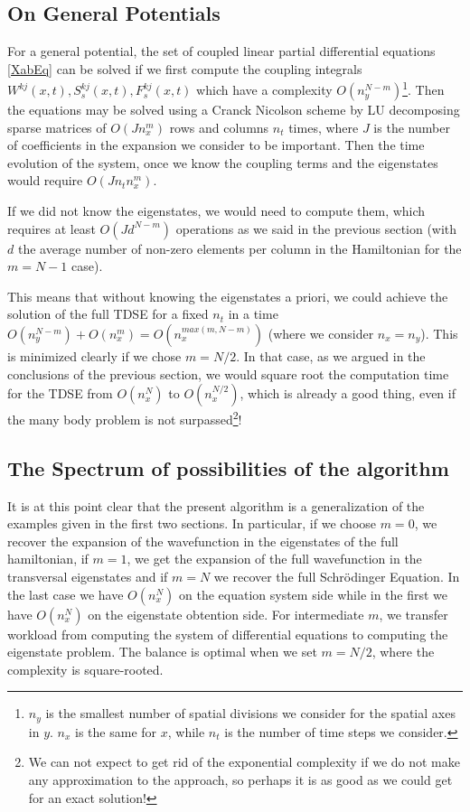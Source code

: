 \documentclass[11pt, a4paper]{article} %
\begin{document}
\subsection{On General Potentials}
For a general potential, the set of coupled linear partial differential equations \eqref{XabEq} can be solved if we first compute the coupling integrals $W^{kj}(x,t),S^{kj}_s(x,t),F^{kj}_s(x,t)$ which have a complexity $O(n_y^{N-m})$\footnote{$n_y$ is the smallest number of spatial divisions we consider for the spatial axes in $y$. $n_x$ is the same for $x$, while $n_t$ is the number of time steps we consider.}. Then the equations may be solved using a Cranck Nicolson scheme by LU decomposing sparse matrices of $O(Jn_x^m)$ rows and columns $n_t$ times, where $J$ is the number of coefficients in the expansion we consider to be important. Then the time evolution of the system, once we know the coupling terms and the eigenstates would require $O(Jn_tn_x^m)$.

If we did not know the eigenstates, we would need to compute them, which requires at least $O(Jd^{N-m})$ operations as we said in the previous section (with $d$ the average number of non-zero elements per column in the Hamiltonian for the $m=N-1$ case).

This means that without knowing the eigenstates a priori, we could achieve the solution of the full TDSE for a fixed $n_t$ in a time $O(n_y^{N-m})+O(n_x^{m})=O(n_x^{max(m, N-m)})$ (where we consider $n_x=n_y$). This is minimized clearly if we chose $m=N/2$. In that case, as we argued in the conclusions of the previous section, we would square root the computation time for the TDSE from $O(n_x^{N})$ to $O(n_x^{N/2})$, which is already a good thing, even if the many body problem is not surpassed\footnote{We can not expect to get rid of the exponential complexity if we do not make any approximation to the approach, so perhaps it is as good as we could get for an exact solution!}!

\subsection{The Spectrum of possibilities of the algorithm}
It is at this point clear that the present algorithm is a generalization of the examples given in the first two sections. In particular, if we choose $m=0$, we recover the expansion of the wavefunction in the eigenstates of the full hamiltonian, if $m=1$, we get the expansion of the full wavefunction in the transversal eigenstates and if $m=N$ we recover the full Schrödinger Equation. In the last case we have $O(n_x^N)$ on the equation system side while in the first we have $O(n_x^N)$ on the eigenstate obtention side. For intermediate $m$, we transfer workload from computing the system of differential equations to computing the eigenstate problem. The balance is optimal when we set $m=N/2$, where the complexity is square-rooted.
\end{document}

